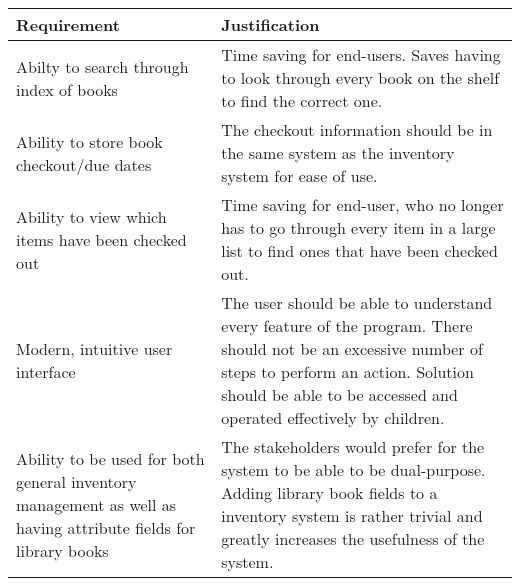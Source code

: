 \documentclass[../../../main.tex]{subfiles}
\begin{document}
\begin{tabular}{ |p{}|p{}| }
    \hline
    \textbf{Requirement}                                                                                          & \textbf{Justification}                                                                         \\
    \hline
    Abilty to search through index of books                                                                       & Time saving for end-users. Saves having to look through every
    book on the shelf to find the correct one.                                                                                                                                                                     \\
    \hline
    Ability to store book checkout/due dates                                                                      & The checkout information should be in the same system as the inventory system for ease of use. \\
    \hline
    Ability to view which items have been checked out                                                             & Time saving for end-user, who no longer has to go through every item in a large list
    to find ones that have been checked out.                                                                                                                                                                       \\
    \hline
    Modern, intuitive user interface                                                                              & The user should be able to understand every feature of the program.
    There should not be an excessive number of steps to perform an action.\newline
    Solution should be able to be accessed and operated effectively by children.                                                                                                                                   \\
    \hline
    Ability to be used for both general inventory management as well as having attribute fields for library books &
    The stakeholders would prefer for the system to be able to be dual-purpose. Adding library book fields to a inventory system
    is rather trivial and greatly increases the usefulness of the system.                                                                                                                                          \\

\end{tabular}
\end{document}
